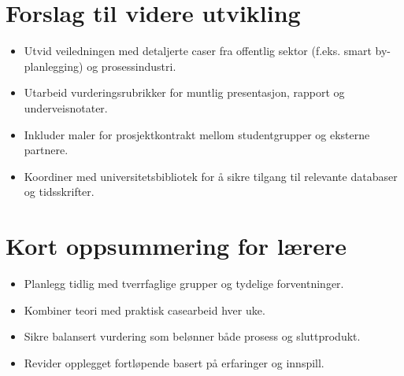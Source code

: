 \section{Forslag til videre utvikling}
\begin{itemize}
    \item Utvid veiledningen med detaljerte caser fra offentlig sektor (f.eks. smart by-planlegging) og prosessindustri.
    \item Utarbeid vurderingsrubrikker for muntlig presentasjon, rapport og underveisnotater.
    \item Inkluder maler for prosjektkontrakt mellom studentgrupper og eksterne partnere.
    \item Koordiner med universitetsbibliotek for å sikre tilgang til relevante databaser og tidsskrifter.
\end{itemize}

\section{Kort oppsummering for lærere}
\begin{itemize}
    \item Planlegg tidlig med tverrfaglige grupper og tydelige forventninger.
    \item Kombiner teori med praktisk casearbeid hver uke.
    \item Sikre balansert vurdering som belønner både prosess og sluttprodukt.
    \item Revider opplegget fortløpende basert på erfaringer og innspill.
\end{itemize}

